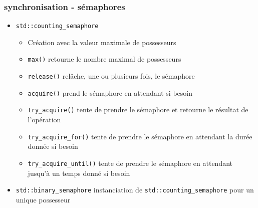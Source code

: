\documentclass[C++.tex]{subfiles}
\begin{document}
\begin{frame}[fragile]
	\frametitle{synchronisation - sémaphores}
	\begin{itemize}
		\item \lstinline|std::counting_semaphore|
		\begin{itemize}
			\item Création avec la valeur maximale de possesseurs
			\item \lstinline|max()| retourne le nombre maximal de possesseurs
			\item \lstinline|release()| relâche, une ou plusieurs fois, le sémaphore


			\item \lstinline|acquire()| prend le sémaphore en attendant si besoin


			\item \lstinline|try_acquire()| tente de prendre le sémaphore et retourne le résultat de l'opération


			\item \lstinline|try_acquire_for()| tente de prendre le sémaphore en attendant la durée donnée si besoin
			\item \lstinline|try_acquire_until()| tente de prendre le sémaphore en attendant jusqu'à un temps donné si besoin

		\end{itemize}
		\item \lstinline|std::binary_semaphore|	instanciation de \lstinline|std::counting_semaphore| pour un unique possesseur
	\end{itemize}
\end{frame}
\end{document}
